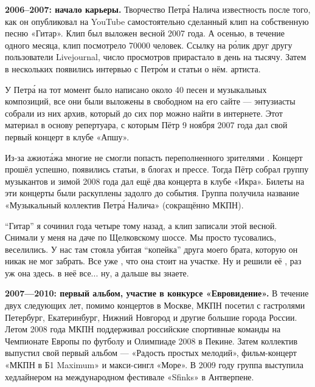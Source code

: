 \textbf{2006--2007: начало карьеры.}
Творчество Петр\'{а} Налича 
известность после того, как он опубликовал на YouTube самостоятельно сделанный клип
на собственную песню «Гитар».
Клип был выложен весной 2007 года. А осенью, в течение одного месяца, клип посмотрело 70000 человек.
Ссылку на р\'{о}лик 
друг другу пользователи Livejournal, число просмотров прирастало в день на тысячу. Затем в нескольких   появились интервью с Петр\'{о}м и статьи о нём.    артиста.

У Петр\'{а} на тот момент было написано около 40 песен и музыкальных композиций, все они были выложены в свободном  на его сайте --- энтузиасты собрали из них архив, который до сих пор можно найти в интернете. Этот материал  в основу репертуара, с которым Пётр 9 ноября 2007 года дал свой первый концерт в клубе «Апшу».

Из-за ажиот\'{а}жа многие не смогли попасть  переполненного зрителями . Концерт прошёл успешно, появились статьи,  в блогах и прессе. Тогда Пётр собрал группу музыкантов и зимой 2008 года дал ещё два концерта в клубе «Икра». Билеты на эти концерты были раскуплены задолго до события. Группа получила название «Музыкальный коллектив Петр\'{а} Налича» (сокращённо МКПН).

\begin{fancyquotes}
    ``Гитар'' я сочинил года четыре тому назад, а клип записали этой весной. Снимали у меня на даче по Щелковскому шоссе. Мы просто тусовались, веселились. У нас там стояла убитая ``копейка'' друга моего брата, которую он никак не мог забрать. Все уже , что она стоит на участке. Ну и решили её , раз уж она здесь.  в неё все... ну, а дальше вы знаете.
\end{fancyquotes}

\textbf{2007---2010: первый альбом, участие в конкурсе «Евровидение».}
В течение двух следующих лет, помимо концертов в Москве, МКПН посетил с гастролями Петербург, Екатеринбург, Нижний Новгород и другие большие города России. Летом 2008 года МКПН поддерживал российские спортивные команды на Чемпионате Европы по футболу и Олимпиаде 2008 в Пекине. Затем коллектив выпустил свой первый альбом --- «Радость простых мелодий», фильм-концерт «МКПН в Б1 Maximum» и макси-сингл «Море». В 2009 году группа выступила хедлайнером на международном фестивале «Sfinks» в Антверпене.

